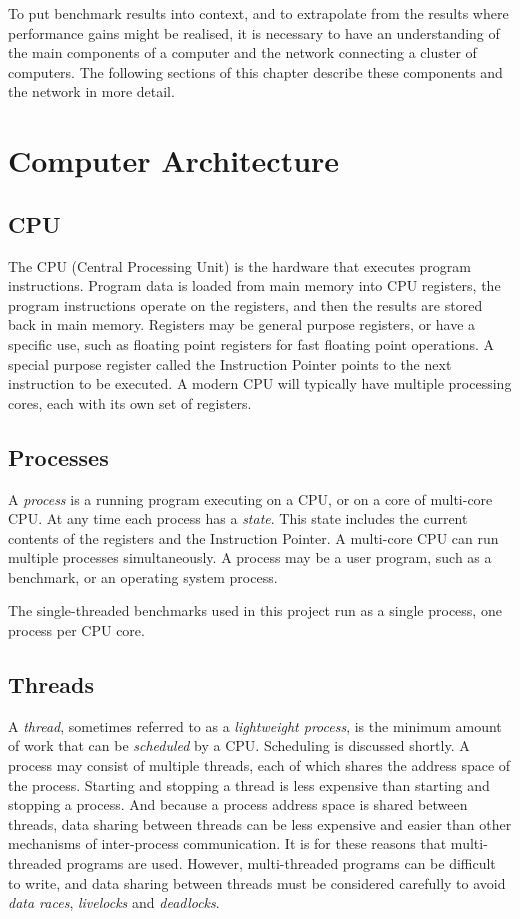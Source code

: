To put benchmark results into context, and to extrapolate from the results where performance gains might be realised, it is necessary to have an understanding of the main components of a computer and the network connecting a cluster of computers. The following sections of this chapter describe these components and the network in more detail.


%
%
\section{Computer Architecture}

\subsection{CPU}
The CPU (Central Processing Unit) is the hardware that executes program instructions. Program data is loaded from main memory into CPU registers, the program instructions operate on the registers, and then the results are stored back in main memory. Registers may be general purpose registers, or have a specific use, such as floating point registers for fast floating point operations. A special purpose register called the Instruction Pointer points to the next instruction to be executed. A modern CPU will typically have multiple processing cores, each with its own set of registers.


\subsection{Processes}
A \emph{process} is a running program executing on a CPU, or on a core of multi-core CPU. At any time each process has a \emph{state}. This state includes the current contents of the registers and the Instruction Pointer. A multi-core CPU can run multiple processes simultaneously. A process may be a user program, such as a benchmark, or an operating system process.

The single-threaded benchmarks used in this project run as a single process, one process per CPU core.   


\subsection{Threads}
A \emph{thread}, sometimes referred to as a \emph{lightweight process}, is the minimum amount of work that can be \emph{scheduled} by a CPU. Scheduling is discussed shortly. A process may consist of multiple threads, each of which shares the address space of the process. Starting and stopping a thread is less expensive than starting and stopping a process. And because a process address space is shared between threads, data sharing between threads can be less expensive and easier than other mechanisms of inter-process communication. It is for these reasons that multi-threaded programs are used. However, multi-threaded programs can be difficult to write, and data sharing between threads must be considered carefully to avoid \emph{data races}, \emph{livelocks} and \emph{deadlocks}.

